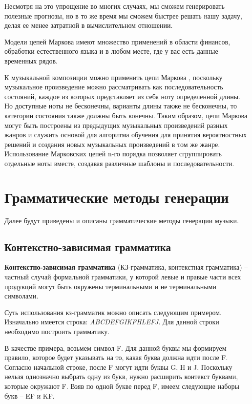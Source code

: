 Несмотря на это упрощение во многих случаях, мы сможем генерировать полезные прогнозы, но в то же время мы сможем быстрее решать нашу задачу, делая ее менее затратной в вычислительном отношении.

Модели цепей Маркова имеют множество применений в области финансов, обработки естественного языка и в любом месте, где у вас есть данные временных рядов.

К музыкальной композиции можно применить цепи Маркова \cite{prob-methods}, поскольку музыкальное произведение можно рассматривать как последовательность состояний, каждое из которых представляет из себя ноту определенной длины. Но доступные ноты не бесконечны, варианты длины также не бесконечны, то категории состояния также должны быть конечны. Таким образом, цепи Маркова могут быть построены из предыдущих музыкальных произведений разных жанров и служить основой для алгоритма обучения для принятия вероятностных решений и создания новых музыкальных произведений в том же жанре. Использование Марковских цепей n-го порядка позволяет сгруппировать отдельные ноты вместе, создавая различные шаблоны и последовательности.


\section{Грамматические методы генерации}

Далее будут приведены и описаны грамматические методы генерации музыки.

\subsection{Контекстно-зависимая грамматика}

\textbf{Контекстно-зависимая грамматика} (КЗ-грамматика, контекстная \linebreak  грамматика) \cite{kz-grammar} -- частный   случай формальной   грамматики, у которой  левые  и  правые  части  всех  продукций  могут  быть  окружены  терминальными  и не терминальными символами.

Суть использования кз-грамматик можно описать следующим примером. Изначально имеется строка: \textit{ABCDEFGIKFHLEFJ}. Для данной строки необходимо построить грамматику.

В качестве примера, возьмем символ F. Для данной буквы мы формируем правило, которое будет указывать на то, какая буква должна идти после F. Согласно начальной строке, после F могут идти буквы G, H и J. Поскольку нельзя однозначно выбрать одну из букв, нужно расширить контекст буквами, которые окружают F. Взяв по одной букве перед F, имеем следующие наборы букв -- EF и KF.

